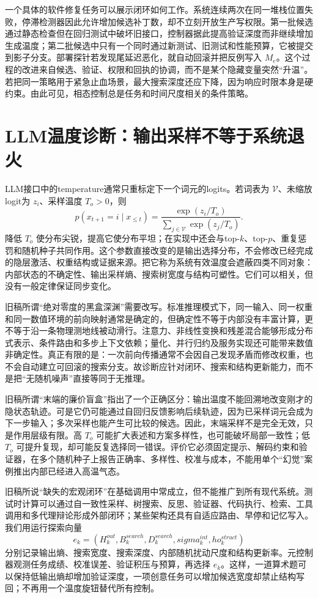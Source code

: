一个具体的软件修复任务可以展示闭环如何工作。系统连续两次在同一堆栈位置失败，停滞检测器因此允许增加候选补丁数，却不立刻开放生产写权限。第一批候选通过静态检查但在回归测试中破坏旧接口，控制器据此提高验证深度而非继续增加生成温度；第二批候选中只有一个同时通过新测试、旧测试和性能预算，它被提交到影子分支。部署探针若发现尾延迟恶化，就自动回滚并把反例写入 $M_e$。这个过程的改进来自候选、验证、权限和回执的协调，而不是某个隐藏变量突然“升温”。若把同一策略用于紧急止血场景，最大搜索深度还应下降，因为响应时限本身是硬约束。由此可见，相态控制总是任务和时间尺度相关的条件策略。

\section{LLM温度诊断：输出采样不等于系统退火}
\label{sec:llm_fake_temperature_pathology}

LLM接口中的temperature通常只重标定下一个词元的logits。若词表为 $\mathcal V$、未缩放logit为 $z_i$、采样温度 $T_o>0$，则
\[
 p(x_{t+1}=i\mid x_{\le t})=
 \frac{\exp(z_i/T_o)}{\sum_{j\in\mathcal V}\exp(z_j/T_o)}.
\]
降低 $T_o$ 使分布尖锐，提高它使分布平坦；在实现中还会与top-$k$、top-$p$、重复惩罚和随机种子共同作用。这个参数直接改变的是输出选择分布，不会修改已经完成的隐层激活、权重结构或证据来源。把它称为系统有效温度会遮蔽四类不同对象：内部状态的不确定性、输出采样熵、搜索树宽度与结构可塑性。它们可以相关，但没有一般定律保证同步变化。

旧稿所谓“绝对零度的黑盒深渊”需要改写。标准推理模式下，同一输入、同一权重和同一数值环境的前向映射通常是确定的，但确定性不等于内部没有丰富计算，更不等于沿一条物理测地线被动滑行。注意力、非线性变换和残差混合能够形成分布式表示、条件路由和多步上下文依赖；量化、并行归约及服务实现还可能带来数值非确定性。真正有限的是：一次前向传播通常不会因自己发现矛盾而修改权重，也不会自动建立可回滚的搜索分支。故诊断应针对闭环、搜索和结构更新能力，而不是把“无随机噪声”直接等同于无推理。

旧稿所谓“末端的廉价盲盒”指出了一个正确区分：输出温度不能回溯地改变刚才的隐状态轨迹。可是它仍可能通过自回归反馈影响后续轨迹，因为已采样词元会成为下一步输入；多次采样也能产生可比较的候选。因此，末端采样不是完全无效，只是作用层级有限。高 $T_o$ 可能扩大表述和方案多样性，也可能破坏局部一致性；低 $T_o$ 可提升复现，却可能反复选择同一错误。评价它必须固定提示、解码约束和验证器，在多个随机种子上报告正确率、多样性、校准与成本，不能用单个“幻觉”案例推出内部已经进入高温气态。

旧稿所说“缺失的宏观闭环”在基础调用中常成立，但不能推广到所有现代系统。测试时计算可以通过自一致性采样、树搜索、反思、验证器、代码执行、检索、工具调用和多代理辩论形成外部闭环；某些架构还具有自适应路由、早停和记忆写入。我们用运行探索向量
\[
 e_k=(H^{out}_k,B^{search}_k,D^{search}_k,sigma^{int}_k,
ho^{struct}_k)
\]
分别记录输出熵、搜索宽度、搜索深度、内部随机扰动尺度和结构更新率。元控制器观测任务成绩、校准误差、验证积压与预算，再选择 $e_k$。这样，一道算术题可以保持低输出熵却增加验证深度，一项创意任务可以增加候选宽度却禁止结构写回；不再用一个温度旋钮替代所有控制。

